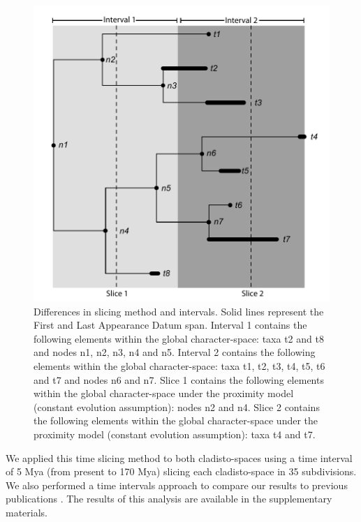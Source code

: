 \documentclass[12pt,letterpaper]{article}
\begin{document}
\begin{figure}[!htbp]
\centering
    \includegraphics[keepaspectratio=true]{Figures/Slicing.pdf}
\caption{Differences in slicing method and intervals. Solid lines represent the First and Last Appearance Datum span. Interval 1 contains the following elements within the global character-space: taxa t2 and t8 and nodes n1, n2, n3, n4 and n5. Interval 2 contains the following elements within the global character-space: taxa t1, t2, t3, t4, t5, t6 and t7 and nodes n6 and n7. Slice 1 contains the following elements within the global character-space under the proximity model (constant evolution assumption): nodes n2 and n4. Slice 2 contains the following elements within the global character-space under the proximity model (constant evolution assumption): taxa t4 and t7.}
\label{fig_slicing}
\end{figure}

We applied this time slicing method to both cladisto-spaces \citep{Slater2012MEE,beckancient2014} using a time interval of 5 Mya (from present to 170 Mya) slicing each cladisto-space in 35 subdivisions. We also performed a time intervals approach to compare our results to previous publications \citep[e.g.][]{Brusatte12092008,brusattedinosaur2012,toljagictriassic-jurassic2013}. The results of this analysis are available in the supplementary materials.
\end{document}

